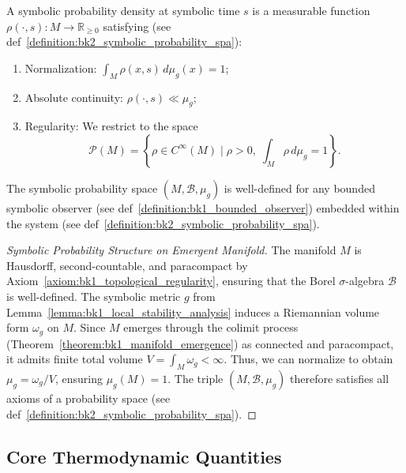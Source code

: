 \begin{definition} 
\label{definition:bk2__symbolic_probability_density} 
A symbolic probability density at symbolic time $s$ is a measurable function $\rho(\cdot, s): M \rightarrow \mathbb{R}_{\geq 0}$ satisfying (see def~\ref{definition:bk2_symbolic_probability_spa}):
\begin{enumerate}
    \item Normalization: $\int_M \rho(x, s) \, d\mu_g(x) = 1$;
    \item Absolute continuity: $\rho(\cdot, s) \ll \mu_g$;
    \item Regularity: We restrict to the space
    \[
    \mathcal{P}(M) = \left\{ \rho \in C^\infty(M) \mid \rho > 0,\; \int_M \rho \, d\mu_g = 1 \right\}.
    \]
\end{enumerate}
\end{definition}

\begin{lemma} 
\label{lem:bk2_wellposedness_symb_prob_space} 
The symbolic probability space $(M, \mathcal{B}, \mu_g)$ is well-defined for any bounded symbolic observer (see def~\ref{definition:bk1_bounded_observer}) embedded within the system (see def~\ref{definition:bk2_symbolic_probability_spa}).
\end{lemma}

\begin{proof}[Symbolic Probability Structure on Emergent Manifold]
\label{proof:bk2_probability_structure_on_manifold}
The manifold $M$ is Hausdorff, second-countable, and paracompact by Axiom~\ref{axiom:bk1_topological_regularity}, ensuring that the Borel $\sigma$-algebra $\mathcal{B}$ is well-defined. The symbolic metric $g$ from Lemma~\ref{lemma:bk1_local_stability_analysis} induces a Riemannian volume form $\omega_g$ on $M$. Since $M$ emerges through the colimit process (Theorem~\ref{theorem:bk1_manifold_emergence}) as connected and paracompact, it admits finite total volume $V = \int_M \omega_g < \infty$. Thus, we can normalize to obtain $\mu_g = \omega_g/V$, ensuring $\mu_g(M) = 1$. The triple $(M, \mathcal{B}, \mu_g)$ therefore satisfies all axioms of a probability space (see def~\ref{definition:bk2_symbolic_probability_spa}).
\end{proof}

\subsection{Core Thermodynamic Quantities}
\label{subsec:bk2_core_thermodynamic_quantities}

